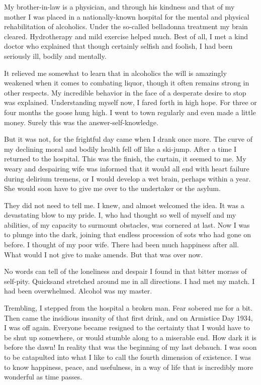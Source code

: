 \begin{biblechapter}
    My brother-in-law is a physician, 
    and through his kindness and that of my mother 
    I was placed in a nationally-known hospital 
    for the mental and physical rehabilitation of alcoholics.
\verse Under the so-called belladonna treatment my brain cleared.
\verse Hydrotherapy and mild exercise helped much.
\verse Best of all, 
    I met a kind doctor who explained that though certainly selfish and foolish, 
    I had been seriously ill, 
    bodily and mentally.

\verse It relieved me somewhat to learn that in alcoholics 
    the will is amazingly weakened when it comes to combating liquor, 
    though it often remains strong in other respects.
\verse My incredible behavior in the face of a desperate desire to stop was explained.
\verse Understanding myself now, I fared forth in high hope.
\verse For three or four months the goose hung high.
\verse I went to town regularly and even made a little money.
\verse Surely this was the answer-self-knowledge.

\verse But it was not, for the frightful day came when I drank once more.
\verse The curve of my declining moral and bodily health fell off like a ski-jump.
\verse After a time I returned to the hospital.
\verse This was the finish, the curtain, it seemed to me.
\verse My weary and despairing wife was informed that 
    it would all end with heart failure during delirium tremens, 
    or I would develop a wet brain, perhaps within a year.
\verse She would soon have to give me over to the undertaker or the asylum.

\verse They did not need to tell me.
\verse I knew, and almost welcomed the idea.
\verse It was a devastating blow to my pride.
\verse I, who had thought so well of myself and my abilities, 
    of my capacity to surmount obstacles, was cornered at last.
\verse Now I was to plunge into the dark, 
    joining that endless procession of sots who had gone on before.
\verse I thought of my poor wife.
\verse There had been much happiness after all.
\verse What would I not give to make amends.
\verse But that was over now.

\verse No words can tell of the loneliness and despair I found 
    in that bitter morass of self-pity.
\verse Quicksand stretched around me in all directions.
\verse I had met my match.
\verse I had been overwhelmed.
\verse Alcohol was my master.

\verse Trembling, I stepped from the hospital a broken man.
\verse Fear sobered me for a bit.
\verse Then came the insidious insanity of that first drink, 
    and on Armistice Day 1934, I was off again.
\verse Everyone became resigned to the certainty that I would have to be shut up somewhere, 
    or would stumble along to a miserable end.
\verse How dark it is before the dawn!
\verse In reality that was the beginning of my last debauch.
\verse I was soon to be catapulted into what I like to call the fourth dimension of existence.
\verse I was to know happiness, peace, and usefulness, 
    in a way of life that is incredibly more wonderful as time passes.
\end{biblechapter}


